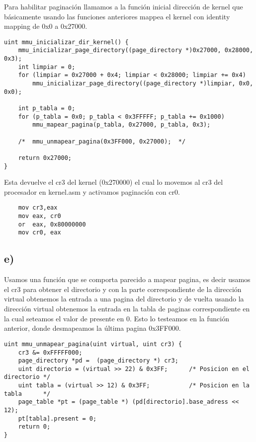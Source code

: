 Para habilitar paginación llamamos a la función inicial dirección de kernel que básicamente usando las funciones anteriores mappea el kernel con identity mapping de 0x0 a 0x27000. 

\begin{codesnippet}
\begin{verbatim}
uint mmu_inicializar_dir_kernel() {
    mmu_inicializar_page_directory((page_directory *)0x27000, 0x28000, 0x3);
    int limpiar = 0;
    for (limpiar = 0x27000 + 0x4; limpiar < 0x28000; limpiar += 0x4)
        mmu_inicializar_page_directory((page_directory *)limpiar, 0x0, 0x0);
    
    int p_tabla = 0;
    for (p_tabla = 0x0; p_tabla < 0x3FFFFF; p_tabla += 0x1000)
        mmu_mapear_pagina(p_tabla, 0x27000, p_tabla, 0x3);

    /*  mmu_unmapear_pagina(0x3FF000, 0x27000);  */

    return 0x27000;
}
\end{verbatim}
\end{codesnippet}

Esta devuelve el cr3 del kernel (0x270000) el cual lo movemos al cr3 del procesador en kernel.asm y activamos paginación con cr0.

\begin{codesnippet}
\begin{verbatim}
    mov cr3,eax
    mov eax, cr0
    or  eax, 0x80000000
    mov cr0, eax
\end{verbatim}
\end{codesnippet}


\subsection*{e)}

Usamos una función que se comporta parecido a mapear pagina, es decir usamos el cr3 para obtener el directorio y con la parte correspondiente de la dirección virtual obtenemos la entrada a una pagina del directorio y de vuelta usando la dirección 
virtual obtenemos la entrada en la tabla de paginas correspondiente en la cual seteamos el valor de presente en 0. Esto lo testeamos en la función anterior, donde desmapeamos la última pagina 0x3FF000. 

\begin{codesnippet}
\begin{verbatim}
uint mmu_unmapear_pagina(uint virtual, uint cr3) {
    cr3 &= 0xFFFFF000;
    page_directory *pd =  (page_directory *) cr3;
    uint directorio = (virtual >> 22) & 0x3FF;      /* Posicion en el directorio */
    uint tabla = (virtual >> 12) & 0x3FF;           /* Posicion en la tabla      */
    page_table *pt = (page_table *) (pd[directorio].base_adress << 12);
    pt[tabla].present = 0;
    return 0;
}
\end{verbatim}
\end{codesnippet}
